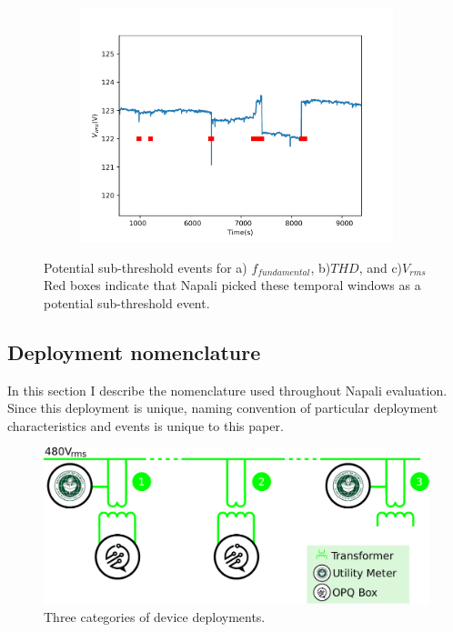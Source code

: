 \begin{figure}[ht!]
    \begin{subfigure}{0.5\textwidth}
        \centering
        \includegraphics[width=1\linewidth]{img/napali_eval/napali_live_rms.pdf}
        \caption{}
        \label{fig:expdes:7:3}
    \end{subfigure}

    \caption{Potential sub-threshold events for a) $f_{fundamental}$, b)$THD$, and c)$V_{rms}$
    Red boxes indicate that Napali picked these temporal windows as a potential sub-threshold event.}
    \label{fig:expdes:7}
\end{figure}

\subsection{Deployment nomenclature}\label{subsec:deploynment-nomenclature}
In this section I describe the nomenclature used throughout Napali evaluation.
Since this deployment is unique, naming convention of particular deployment characteristics and events is unique to this paper.

\begin{figure}[ht!]
    \centering
    \includegraphics[width=1\linewidth]{img/deployment/meter_types.pdf}
    \caption{Three categories of device deployments.}
    \label{fig:expdes:nomenclature}
\end{figure}

